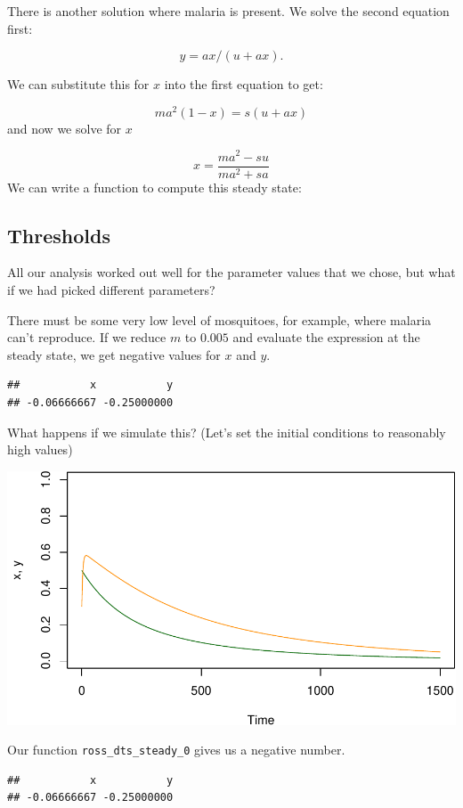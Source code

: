 \documentclass[
]{book}
\begin{document}
There is another solution where malaria is present. We solve the second equation first:

\[y = a x / (u + a x).\]

We can substitute this for \(x\) into the first equation to get:

\[m a^2 (1-x) =  s (u+ax)\]
and now we solve for \(x\)

\[x = \frac{\textstyle{ma^2 - su}}{\textstyle{ma^2 + sa}}\]
We can write a function to compute this steady state:

\subsection{Thresholds}\label{thresholds}

All our analysis worked out well for the parameter values that we chose, but what if we had picked different parameters?

There must be some very low level of mosquitoes, for example, where malaria can't reproduce. If we reduce \(m\) to \(0.005\) and evaluate the expression at the steady state, we get negative values for \(x\) and \(y\).

\begin{verbatim}
##           x           y 
## -0.06666667 -0.25000000
\end{verbatim}

What happens if we simulate this? (Let's set the initial conditions to reasonably high values)

\includegraphics{docs/figs/unnamed-chunk-16-1.pdf}

Our function \texttt{ross\_dts\_steady\_0} gives us a negative number.

\begin{verbatim}
##           x           y 
## -0.06666667 -0.25000000
\end{verbatim}
\end{document}
